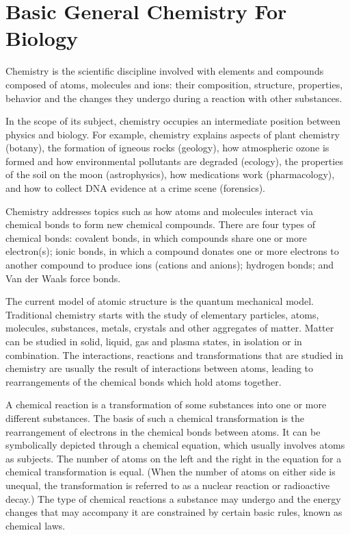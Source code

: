 \hypertarget{basic-general-chemistry-for-biology}{%
\chapter{Basic General Chemistry For Biology}\label{basic-general-chemistry-for-biology}}

Chemistry is the scientific discipline involved with elements and compounds composed of atoms, molecules and ions: their composition, structure, properties, behavior and the changes they undergo during a reaction with other substances.

In the scope of its subject, chemistry occupies an intermediate position between physics and biology. For example, chemistry explains aspects of plant chemistry (botany), the formation of igneous rocks (geology), how atmospheric ozone is formed and how environmental pollutants are degraded (ecology), the properties of the soil on the moon (astrophysics), how medications work (pharmacology), and how to collect DNA evidence at a crime scene (forensics).

Chemistry addresses topics such as how atoms and molecules interact via chemical bonds to form new chemical compounds. There are four types of chemical bonds: covalent bonds, in which compounds share one or more electron(s); ionic bonds, in which a compound donates one or more electrons to another compound to produce ions (cations and anions); hydrogen bonds; and Van der Waals force bonds.

The current model of atomic structure is the quantum mechanical model. Traditional chemistry starts with the study of elementary particles, atoms, molecules, substances, metals, crystals and other aggregates of matter. Matter can be studied in solid, liquid, gas and plasma states, in isolation or in combination. The interactions, reactions and transformations that are studied in chemistry are usually the result of interactions between atoms, leading to rearrangements of the chemical bonds which hold atoms together.

A chemical reaction is a transformation of some substances into one or more different substances. The basis of such a chemical transformation is the rearrangement of electrons in the chemical bonds between atoms. It can be symbolically depicted through a chemical equation, which usually involves atoms as subjects. The number of atoms on the left and the right in the equation for a chemical transformation is equal. (When the number of atoms on either side is unequal, the transformation is referred to as a nuclear reaction or radioactive decay.) The type of chemical reactions a substance may undergo and the energy changes that may accompany it are constrained by certain basic rules, known as chemical laws.

